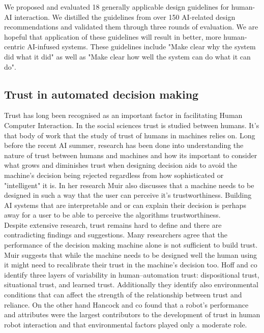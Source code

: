\documentclass[manuscript,screen,review]{acmart}
\begin{document}
We proposed and evaluated 18 generally applicable design
guidelines for human-AI interaction.
We distilled the guidelines from over 150 AI-related design recommendations and
validated them through three rounds of evaluation.
We are hopeful that application of these guidelines will result in
better, more human-centric AI-infused systems.
These guidelines include "Make clear why the system did what it did" as well as "Make clear how well the system can do what it can
do"\cite{Amershi2019}.

\subsection{Trust in automated decision making}\label{subsec:trust}
Trust has long been recognised as an important factor in facilitating Human Computer Interaction\cite{Lee2008}.
In the social sciences trust is studied between humans.
It's that body of work that the study of trust of humans in machines relies on.
Long before the recent AI summer, research has been done into understanding the nature of trust between humans and machines
and how its important to consider what grows and diminishes trust when designing decision aids to avoid the machine's
decision being rejected regardless from how sophisticated or "intelligent" it is.\cite{Muir1987}
In her research Muir also discusses that a machine needs to be designed in such a way that the user can perceive it's trustworthiness\cite{Muir1987}.
Building AI systems that are interpretable and or can explain their decision is perhaps away for a user to be able to perceive
the algorithms trustworthiness.\\
Despite extensive research, trust remains hard to define and there are contradicting findings and suggestions.
Many researchers agree that the performance of the decision making machine alone is not sufficient to build trust.
Muir suggests that while the machine needs to be designed well the human using it might need to recalibrate their
trust in the machine's decision too\cite{Muir1987}.
Hoff and co identify three layers of variability in human–automation trust: dispositional trust, situational trust, and learned trust.
Additionally they identify also environmental conditions that can affect the strength of the relationship between trust and reliance\cite{Hoff2015}.
On the other hand Hancock and co found that a robot's performance and attributes were the largest contributors to the development of trust in human robot interaction and that environmental factors played only a moderate role.
\end{document}
